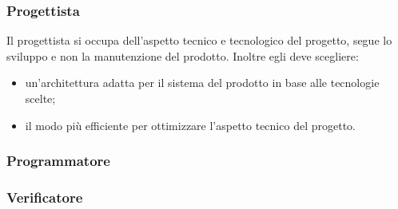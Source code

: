 \subsubsection{Progettista}
Il progettista si occupa dell'aspetto tecnico e tecnologico del progetto, segue lo sviluppo e non la manutenzione del prodotto. Inoltre egli deve scegliere: 
\begin{itemize}
\item un'architettura adatta per il sistema del prodotto in base alle tecnologie scelte;
\item il modo più efficiente per ottimizzare l'aspetto tecnico del progetto.
\end{itemize}
\subsubsection{Programmatore}

\subsubsection{Verificatore}
